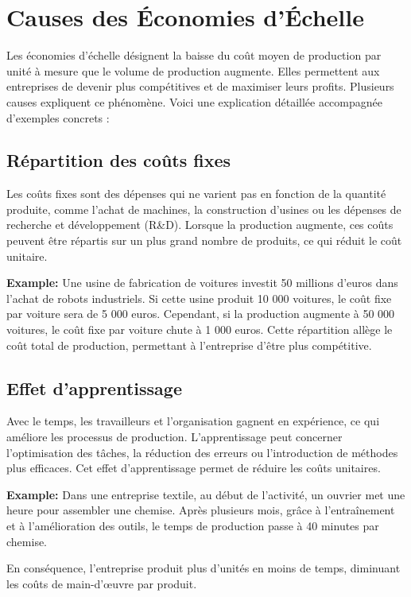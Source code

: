 \chapter*{Causes des Économies d'Échelle}
\setcounter{chapter}{1}



Les économies d'échelle désignent la baisse du coût moyen de production par
unité à mesure que le volume de production augmente. Elles permettent aux
entreprises de devenir plus compétitives et de maximiser leurs profits. Plusieurs
causes expliquent ce phénomène. Voici une explication détaillée accompagnée
d'exemples concrets :
\setcounter{section}{1}
\section{Répartition des coûts fixes}

Les coûts fixes sont des dépenses qui ne varient pas en fonction de la quantité
produite, comme l'achat de machines, la construction d'usines ou les dépenses de
recherche et développement (R&D). Lorsque la production augmente, ces coûts
peuvent être répartis sur un plus grand nombre de produits, ce qui réduit le coût
unitaire. 
\par
\textbf{Example:}
Une usine de fabrication de voitures investit 50 millions d'euros dans l'achat de
robots industriels. Si cette usine produit 10 000 voitures, le coût fixe par voiture
sera de 5 000 euros. Cependant, si la production augmente à 50 000 voitures, le
coût fixe par voiture chute à 1 000 euros. Cette répartition allège le coût total de
production, permettant à l’entreprise d’être plus compétitive.

\section{Effet d'apprentissage}

Avec le temps, les travailleurs et l’organisation gagnent en expérience, ce qui
améliore les processus de production. L’apprentissage peut concerner
l’optimisation des tâches, la réduction des erreurs ou l’introduction de méthodes
plus efficaces. Cet effet d’apprentissage permet de réduire les coûts unitaires.
\par
\textbf{Example:}
Dans une entreprise textile, au début de l’activité, un ouvrier met une heure pour
assembler une chemise. Après plusieurs mois, grâce à l’entraînement et à
l’amélioration des outils, le temps de production passe à 40 minutes par chemise.
\par
En conséquence, l’entreprise produit plus d’unités en moins de temps, diminuant
les coûts de main-d'œuvre par produit.

